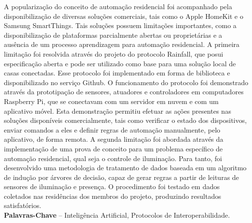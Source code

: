\documentclass[times]{politex}
\begin{document}
\begin{resumo}
A popularização do conceito de automação residencial foi acompanhado pela disponibilização de diversas soluções comerciais, tais como o Apple HomeKit e o Samsung SmartThings. Tais soluções possuem limitações importantes, como a disponibilização de plataformas parcialmente abertas ou proprietárias e a ausência de um processo aprendizagem para automação residencial. A primeira limitação foi resolvida através do projeto do protocolo Rainfall, que posui especificação aberta e pode ser utilizado como base para uma solução local de casas conectadas. Esse protocolo foi implementado em forma de biblioteca e disponibilizado no serviço Github. O funcionamento do protocolo foi demonstrado através da prototipação de sensores, atuadores e controladores em computadores Raspberry Pi, que se conectavam com um servidor em nuvem e com um aplicativo móvel. Esta demonstração permitiu efetuar as ações presentes nas soluções disponíveis comercialmente, tais como verificar o estado dos dispositivos, enviar comandos a eles e definir regras de automação manualmente, pelo aplicativo, de forma remota. A segunda limitação foi abordada através da implementação de uma prova de conceito para um problema específico de automação residencial, qual seja o controle de iluminação. Para tanto, foi desenvolvido uma metodologia de tratamento de dados baseada em um algoritmo de indução por árvores de decisão, capaz de gerar regras a partir de leituras de sensores de iluminação e presença. O procedimento foi testado em dados coletados nas residências dos membros do projeto, produzindo resultados satisfatórios.
%
\\[3\baselineskip]
%
\textbf{Palavras-Chave} -- Inteligência Artificial, Protocolos de Interoperabilidade.
\end{resumo}
\end{document}
